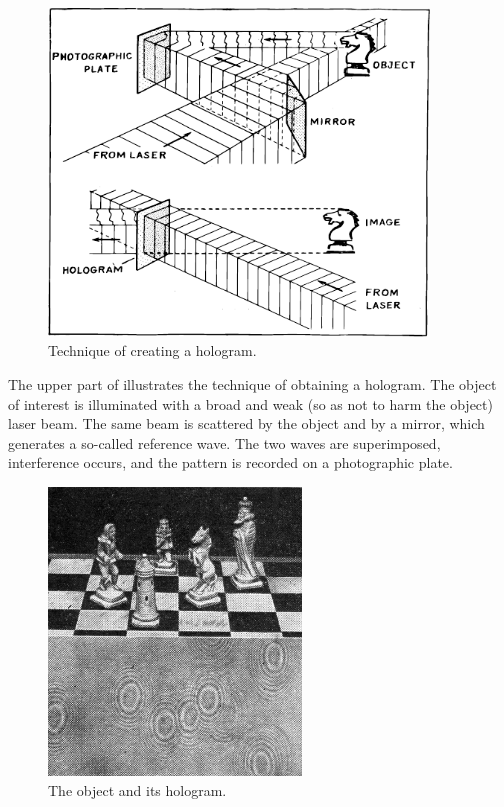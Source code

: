 \begin{figure}[!ht]
\centering
\includegraphics[width=0.9\textwidth]{figures/fig-02-09.pdf}
\caption{Technique of creating a hologram.}
\label{fig-2.9}
\end{figure}
The upper part of  illustrates the technique of obtaining a hologram. The object of interest is illum­inated with a broad and weak (so as not to harm the object) laser beam. The same beam is scattered by the object and by a mirror, which generates a so-called refer­ence wave. The two waves are superimposed, interference occurs, and the pattern is recorded on a photographic plate.
\begin{figure}[!ht]
\centering
\includegraphics[width=0.6\textwidth]{figures/fig-02-10.jpg}
\caption{The object and its hologram.}
\label{fig-2.10}
\end{figure}
